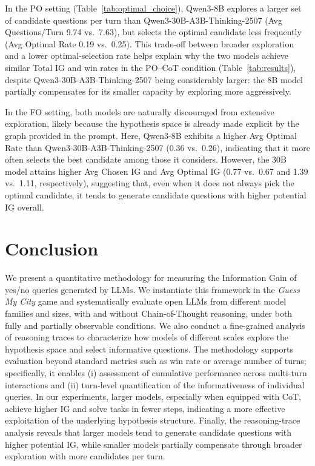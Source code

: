 \documentclass[letterpaper]{article} %
\begin{document}
In the PO setting (Table~\ref{tab:optimal_choice}), Qwen3-8B explores a larger set of candidate questions per turn than Qwen3-30B-A3B-Thinking-2507 (Avg Questions/Turn 9.74 vs.\ 7.63), but selects the optimal candidate less frequently (Avg Optimal Rate 0.19 vs.\ 0.25). This trade-off between broader exploration and a lower optimal-selection rate helps explain why the two models achieve similar Total IG and win rates in the PO–CoT condition (Table~\ref{tab:results}), despite Qwen3-30B-A3B-Thinking-2507 being considerably larger: the 8B model partially compensates for its smaller capacity by exploring more aggressively.

In the FO setting, both models are naturally discouraged from extensive exploration, likely because the hypothesis space is already made explicit by the graph provided in the prompt. Here, Qwen3-8B exhibits a higher Avg Optimal Rate than Qwen3-30B-A3B-Thinking-2507 (0.36 vs.\ 0.26), indicating that it more often selects the best candidate among those it considers. However, the 30B model attains higher Avg Chosen IG and Avg Optimal IG (0.77 vs.\ 0.67 and 1.39 vs.\ 1.11, respectively), suggesting that, even when it does not always pick the optimal candidate, it tends to generate candidate questions with higher potential IG overall.



\section{Conclusion}

We present a quantitative methodology for measuring the Information Gain of yes/no queries generated by LLMs. We instantiate this framework in the \emph{Guess My City} game and systematically evaluate open LLMs from different model families and sizes, with and without Chain-of-Thought reasoning, under both fully and partially observable conditions. We also conduct a fine-grained analysis of reasoning traces to characterize how models of different scales explore the hypothesis space and select informative questions. The methodology supports evaluation beyond standard metrics such as win rate or average number of turns; specifically, it enables (i) assessment of cumulative performance across multi-turn interactions and (ii) turn-level quantification of the informativeness of individual queries. In our experiments, larger models, especially when equipped with CoT, achieve higher IG and solve tasks in fewer steps, indicating a more effective exploitation of the underlying hypothesis structure. Finally, the reasoning-trace analysis reveals that larger models tend to generate candidate questions with higher potential IG, while smaller models partially compensate through broader exploration with more candidates per turn.
\end{document}
